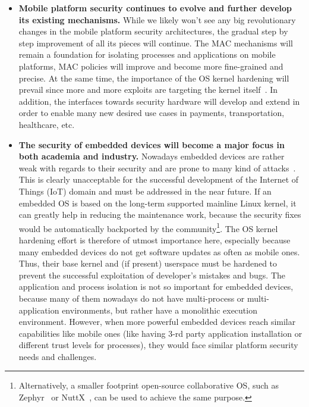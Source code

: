 \begin{itemize}
	\item \textbf{Mobile platform security continues to evolve and further develop its existing mechanisms.} While we likely won't see any big revolutionary changes in the mobile platform security architectures, the gradual step by step improvement of all its pieces will continue. The MAC mechanisms will remain a foundation for isolating processes and applications on mobile platforms, MAC policies will improve and become more fine-grained and precise. At the same time, the importance of the OS kernel hardening will prevail since more and more exploits are targeting the kernel itself~\cite{stoep2016android}. In addition, the interfaces towards security hardware will develop and extend in order to enable many new desired use cases in payments, transportation, healthcare, etc.
		
	\item \textbf{The security of embedded devices will become a major focus in both academia and industry.} Nowadays embedded devices are rather weak with regards to their security and are prone to many kind of attacks~\cite{Choo2016}. This is clearly unacceptable for the successful development of the Internet of Things (IoT) domain and must be addressed in the near future. If an embedded OS is based on the long-term supported mainline Linux kernel, it can greatly help in reducing the maintenance work, because the security fixes would be automatically backported by the community\footnote{Alternatively, a smaller footprint open-source collaborative OS, such as Zephyr~\cite{zephyr} or NuttX~\cite{NuttX}, can be used to achieve the same purpose.}. The OS kernel hardening effort is therefore of utmost importance here, especially because many embedded devices do not get software updates as often as mobile ones. Thus, their base kernel and (if present) userspace must be hardened to prevent the successful exploitation of developer's mistakes and bugs. The application and process isolation is not so important for embedded devices, because many of them nowadays do not have multi-process or multi-application environments, but rather have a monolithic execution environment. However, when more powerful embedded devices reach similar capabilities like mobile ones (like having 3-rd party application installation or different trust levels for processes), they would face similar platform security needs and challenges.
	

\end{itemize}
